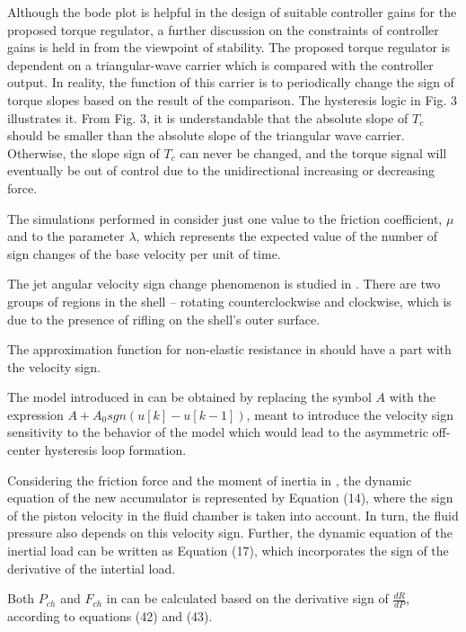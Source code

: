 \documentclass[11pt]{book}
\begin{document}
Although the bode plot is helpful in the design of suitable controller
gains for the proposed torque regulator, a further discussion on the
constraints of controller gains is held in \cite{zhang2015constant}
from the viewpoint of stability. The proposed torque regulator is
dependent on a triangular-wave carrier which is compared with the
controller output. In reality, the function of this carrier is to
periodically change the sign of torque slopes based on the result
of the comparison. The hysteresis logic in Fig. 3 illustrates it.
From Fig. 3, it is understandable that the absolute slope of $T_{c}$
should be smaller than the absolute slope of the triangular wave carrier.
Otherwise, the slope sign of $T_{c}$ can never be changed, and the
torque signal will eventually be out of control due to the unidirectional
increasing or decreasing force.

The simulations performed in \cite{lima2017construction} consider
just one value to the friction coefficient, $\mu$ and to the parameter
$\lambda$, which represents the expected value of the number of sign
changes of the base velocity per unit of time.

The jet angular velocity sign change phenomenon is studied in \cite{rassokha2017numerical}.
There are two groups of regions in the shell -- rotating counterclockwise
and clockwise, which is due to the presence of rifling on the shell's
outer surface.

The approximation function for non-elastic resistance in \cite{lazutkin2017non}
should have a part with the velocity sign.

The model introduced in \cite{fujii2018bouc} can be obtained by replacing
the symbol $A$ with the expression $A+A_{0}sgn\left(u\left[k\right]-u\left[k-1\right]\right)$,
meant to introduce the velocity sign sensitivity to the behavior of
the model which would lead to the asymmetric off-center hysteresis
loop formation.

Considering the friction force and the moment of inertia in \cite{zhao2019design},
the dynamic equation of the new accumulator is represented by Equation
(14), where the sign of the piston velocity in the fluid chamber is
taken into account. In turn, the fluid pressure also depends on this
velocity sign. Further, the dynamic equation of the inertial load
can be written as Equation (17), which incorporates the sign of the
derivative of the intertial load.

Both $P_{ch}$ and $F_{ch}$ in \cite{sahu2020static} can be calculated
based on the derivative sign of $\frac{dR}{dP}$, according to equations
(42) and (43).
\end{document}
